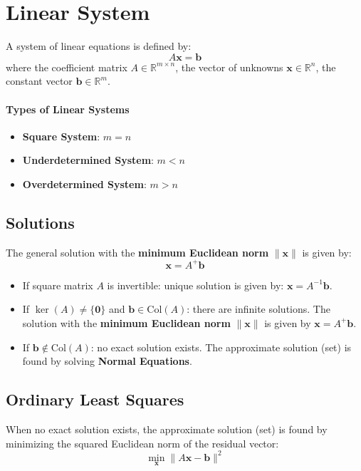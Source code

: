 \documentclass{article}
\begin{document}
\newpage
\section{Linear System}

A system of linear equations is defined by:
\[
    A\mathbf{x} = \mathbf{b}
\]
where the coefficient matrix $A \in \mathbb{R}^{m \times n}$, the vector of unknowns $\mathbf{x} \in \mathbb{R}^n$, the constant vector $\mathbf{b} \in \mathbb{R}^m$.
\paragraph{Types of Linear Systems}
\begin{itemize}
    \item \textbf{Square System}: $m = n$
    \item \textbf{Underdetermined System}: $m < n$
    \item \textbf{Overdetermined System}: $m > n$
\end{itemize}

\subsection{Solutions}
The general solution with the \textbf{minimum Euclidean norm} $\|\mathbf{x}\|$ is given by:
\[
    \mathbf{x} = A^+ \mathbf{b}
\]
\begin{itemize}
    \item If square matrix $A$ is invertible: unique solution is given by: $\mathbf{x} = A^{-1} \mathbf{b}$.
    \item If $\ker(A) \neq \{\mathbf{0}\}$ and $\mathbf{b} \in \text{Col}(A)$: there are infinite solutions. The solution with the \textbf{minimum Euclidean norm} $\|\mathbf{x}\|$ is given by $\mathbf{x} = A^+ \mathbf{b}$.
    \item If $\mathbf{b} \notin \text{Col}(A)$: no exact solution exists. The approximate solution (set) is found by solving \textbf{Normal Equations}.
\end{itemize}

\subsection{Ordinary Least Squares}
When no exact solution exists, the approximate solution (set) is found by minimizing the squared Euclidean norm of the residual vector:
\[
    \min_{\mathbf{x}} \|A\mathbf{x} - \mathbf{b}\|^2
\]
\end{document}
